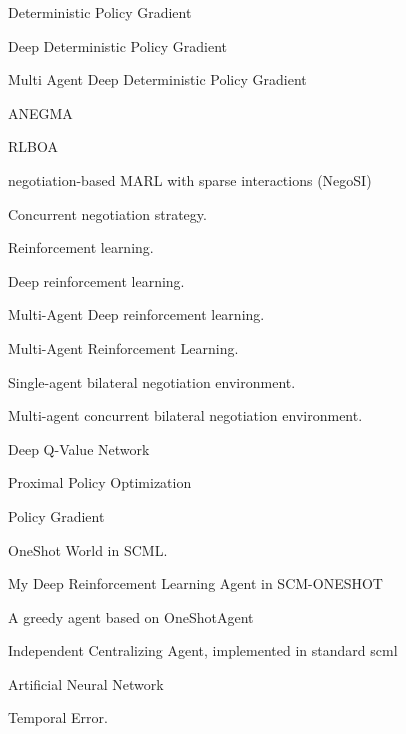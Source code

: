 %
{%
Deterministic Policy Gradient
}

%
{%
Deep Deterministic Policy Gradient
}

%
{%
Multi Agent Deep Deterministic Policy Gradient
}

%
{%
ANEGMA
}

%
{%
RLBOA
}

%
{%
negotiation-based MARL with sparse interactions (NegoSI)
}

%
{%
Concurrent negotiation strategy.
}

%
{%
Reinforcement learning.
}

%
{%
Deep reinforcement learning.
}

%
{%
Multi-Agent Deep reinforcement learning.
}

%
{%
Multi-Agent Reinforcement Learning.
}

%
{%
Single-agent bilateral negotiation environment.
}

%
{%
Multi-agent concurrent bilateral negotiation environment.
}

%
{%
Deep Q-Value Network
}

%
{%
Proximal Policy Optimization
}

%
{%
Policy Gradient
}

%
{%
OneShot World in SCML.
}

%
{%
My Deep Reinforcement Learning Agent in SCM-ONESHOT
}

%
{%
A greedy agent based on OneShotAgent
}

%
{%
Independent Centralizing Agent, implemented in standard scml
}

%
{%
Artificial Neural Network
}

%
{%
Temporal Error.
}

